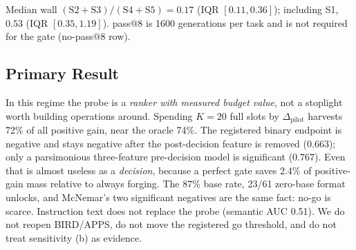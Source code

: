 Median wall
$(\mathrm{S2}{+}\mathrm{S3})/(\mathrm{S4}{+}\mathrm{S5})=0.17$
(IQR $[0.11,0.36]$); including S1, $0.53$ (IQR $[0.35,1.19]$).
pass@8 is 1600 generations per task and is not required for the
gate (no-pass@8 row).

\subsection{Primary Result}
\label{sec:primary}
In this regime the probe is a \emph{ranker with measured budget
value}, not a stoplight worth building operations around.
Spending $K{=}20$ full slots by $\Delta_{\mathrm{pilot}}$ harvests
72\% of all positive gain, near the oracle 74\%.
The registered binary endpoint is negative and stays negative
after the post-decision feature is removed ($0.663$); only a
parsimonious three-feature pre-decision model is significant
($0.767$). Even that is almost useless as a \emph{decision},
because a perfect gate saves 2.4\% of positive-gain mass relative
to always forging.
The 87\% base rate, 23/61 zero-base format unlocks, and McNemar's
two significant negatives are the same fact: no-go is scarce.
Instruction text does not replace the probe (semantic AUC 0.51).
We do not reopen BIRD/APPS, do not move the registered go
threshold, and do not treat sensitivity (b) as evidence.
